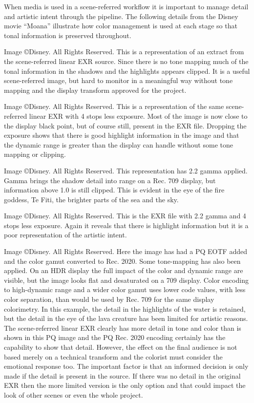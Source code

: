 When media is used in a scene-referred workflow it is important to manage detail and artistic intent through the pipeline. The following details from the Disney movie “Moana” illustrate how color management is used at each stage so that tonal information is preserved throughout. 

Image ©Disney. All Rights Reserved.
This is a representation of an extract from the scene-referred linear EXR source. Since there is no tone mapping much of the tonal information in the shadows and the highlights appears clipped. It is a useful scene-referred image, but hard to monitor in a meaningful way without tone mapping and the display transform approved for the project.


Image ©Disney. All Rights Reserved.
This is a representation of the same scene-referred linear EXR with 4 stops less exposure. Most of the image is now close to the display black point, but of course still, present in the EXR file. Dropping the exposure shows that there is good highlight information in the image and that the dynamic range is greater than the display can handle without some tone mapping or clipping.


Image ©Disney. All Rights Reserved.
This representation has 2.2 gamma applied. Gamma brings the shadow detail into range on a Rec. 709 display, but information above 1.0 is still clipped. This is evident in the eye of the fire goddess, Te Fiti, the brighter parts of the sea and the sky. 

Image ©Disney. All Rights Reserved.
This is the EXR file with 2.2 gamma and 4 stops less exposure. Again it reveals that there is highlight information but it is a poor representation of the artistic intent. 

Image ©Disney. All Rights Reserved.
Here the image has had a PQ EOTF added and the color gamut converted to Rec. 2020. Some tone-mapping has also been applied. On an HDR display the full impact of the color and dynamic range are visible, but the image looks flat and desaturated on a 709 display. Color encoding to high-dynamic range and a wider color gamut uses lower code values, with less color separation, than would be used by Rec. 709 for the same display colorimetry. In this example, the detail in the highlights of the water is retained, but the detail in the eye of the lava creature has been limited for artistic reasons. The scene-referred linear EXR clearly has more detail in tone and color than is shown in this PQ image and the PQ  Rec. 2020 encoding certainly has the capability to show that detail. However, the effect on the final audience is not based merely on a technical transform and the colorist must consider the emotional response too. The important factor is that an informed decision is only made if the detail is present in the source. If there was no detail in the original EXR then the more limited version is the only option and that could impact the look of other scenes or even the whole project.


